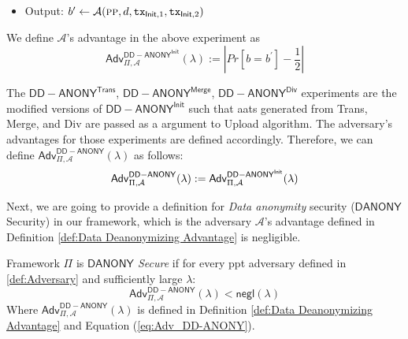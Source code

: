\begin{definition}
\begin{itemize}
                
                \item[] Output: $b^\prime \leftarrow \mathcal{A}(\textsc{pp}, d, \texttt{tx}_{\mathsf{Init}, 1}, \texttt{tx}_{\mathsf{Init}, 2} )$
        \end{itemize}
We define $\mathcal{A}$'s advantage in the above experiment as
\begin{equation}
\label{eq:Adv_DD-ANONY_Init}
    \mathsf{Adv}^{\mathsf{DD-ANONY}^\textsf{Init}}_{\Pi, \mathcal{A}}(\lambda) := |Pr[b=b^\prime] - \frac{1}{2}|
\end{equation}

The $\mathsf{DD-ANONY}^\textsf{Trans}$, $\mathsf{DD-ANONY}^\textsf{Merge}$, $\mathsf{DD-ANONY}^\textsf{Div}$ experiments are the modified versions of $\mathsf{DD-ANONY}^\textsf{Init}$ such that \gls{aat}s generated from \textsf{Trans}, \textsf{Merge}, and \textsf{Div} are passed as a argument to \textsf{Upload} algorithm. The adversary's advantages for those experiments are defined accordingly. Therefore, we can define  $\mathsf{Adv}^{\mathsf{DD-ANONY}}_{\Pi, \mathcal{A}}(\lambda)$ as follows:
\begin{align}
\label{eq:Adv_DD-ANONY}
    \notag
    \mathsf{Adv}^{\mathsf{DD-ANONY}}_{\Pi, \mathcal{A}}(\lambda) :=
    \mathsf{Adv}^{\mathsf{DD-ANONY}^\textsf{Init}}_{\Pi, \mathcal{A}}(\lambda)
\end{align}

            \end{definition}

Next, we are going to provide a definition for \textit{Data anonymity} security ($\mathsf{DANONY}$ Security) in our framework, which is the adversary $\mathcal{A}$'s advantage defined in Definition \ref{def:Data Deanonymizing Advantage} is negligible.

\begin{definition}
    \label{def:DANONY}
    Framework $\Pi$ is \textit{$\mathsf{DANONY}$ Secure} if for every \gls{ppt} adversary defined in \ref{def:Adversary} and sufficiently large $\lambda$:
    \begin{equation*}
        \mathsf{Adv}^{\mathsf{DD-ANONY}}_{\Pi, \mathcal{A}}(\lambda) < \mathsf{negl}(\lambda)
    \end{equation*}
    Where $\mathsf{Adv}^{\mathsf{DD-ANONY}}_{\Pi, \mathcal{A}}(\lambda)$ is defined in Definition \ref{def:Data Deanonymizing Advantage} and Equation (\ref{eq:Adv_DD-ANONY}).
    \end{definition}

